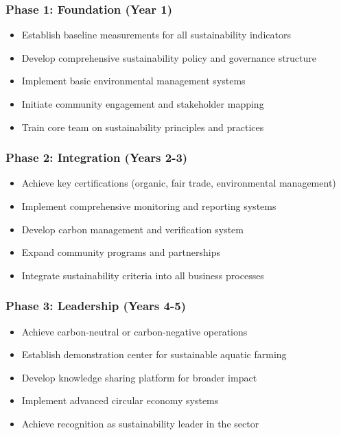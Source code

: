 \subsubsection{Phase 1: Foundation (Year 1)}
\begin{itemize}
    \item Establish baseline measurements for all sustainability indicators
    \item Develop comprehensive sustainability policy and governance structure
    \item Implement basic environmental management systems
    \item Initiate community engagement and stakeholder mapping
    \item Train core team on sustainability principles and practices
\end{itemize}

\subsubsection{Phase 2: Integration (Years 2-3)}
\begin{itemize}
    \item Achieve key certifications (organic, fair trade, environmental management)
    \item Implement comprehensive monitoring and reporting systems
    \item Develop carbon management and verification system
    \item Expand community programs and partnerships
    \item Integrate sustainability criteria into all business processes
\end{itemize}

\subsubsection{Phase 3: Leadership (Years 4-5)}
\begin{itemize}
    \item Achieve carbon-neutral or carbon-negative operations
    \item Establish demonstration center for sustainable aquatic farming
    \item Develop knowledge sharing platform for broader impact
    \item Implement advanced circular economy systems
    \item Achieve recognition as sustainability leader in the sector
\end{itemize}

